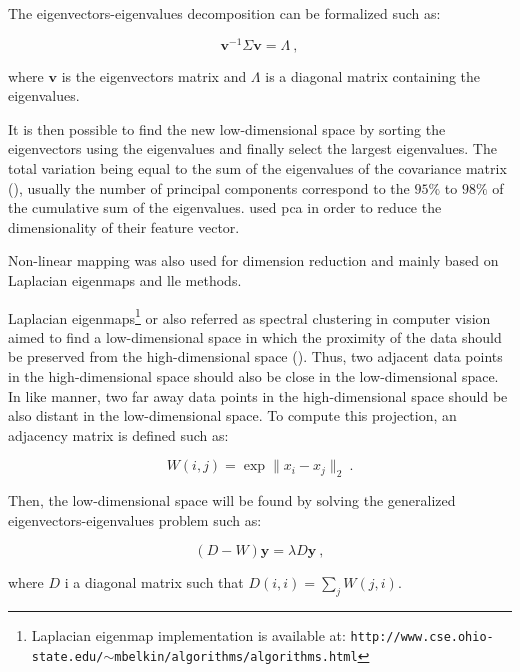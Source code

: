 The eigenvectors-eigenvalues decomposition can be formalized such as:

\begin{equation}
	\mathbf{v}^{-1} \Sigma \mathbf{v} = \Lambda \ ,
	\label{eq:eigpca}
\end{equation}

\noindent where $\mathbf{v}$ is the eigenvectors matrix and $\Lambda$ is a diagonal matrix containing the eigenvalues. 

It is then possible to find the new low-dimensional space by sorting the eigenvectors using the eigenvalues and finally select the largest eigenvalues. The total variation being equal to the sum of the eigenvalues of the covariance matrix (\cite{Fodor2002}), usually the number of principal components correspond to the $95\%$ to $98\%$ of the cumulative sum of the eigenvalues. \cite{Tiwari2008,Tiwari2009,Tiwari2012} used \ac{pca} in order to reduce the dimensionality of their feature vector.

Non-linear mapping was also used for dimension reduction and mainly based on Laplacian eigenmaps and \acf{lle} methods.

Laplacian eigenmaps\footnote{Laplacian eigenmap implementation is available at: \texttt{http://www.cse.ohio-state.edu/\allowbreak $\sim$mbelkin/algorithms/algorithms.html}} or also referred as spectral clustering in computer vision aimed to find a low-dimensional space in which the proximity of the data should be preserved from the high-dimensional space (\cite{Shi2000,Belkin2001}). Thus, two adjacent data points in the high-dimensional space should also be close in the low-dimensional space. In like manner, two far away data points in the high-dimensional space should be also distant in the low-dimensional space. To compute this projection, an adjacency matrix is defined such as:

\begin{equation}
	W(i,j) = \exp \| x_i - x_j \|_2 \ .
	\label{eq:gew}
\end{equation}

Then, the low-dimensional space will be found by solving the generalized eigenvectors-eigenvalues problem such as:

\begin{equation}
	(D-W)\mathbf{y} = \lambda D \mathbf{y} \ ,
	\label{eq:geeig}
\end{equation}

\noindent where $D$ i a diagonal matrix such that $D(i,i) = \sum_j W(j,i)$.

